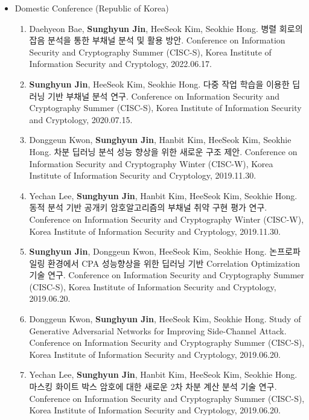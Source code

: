 \documentclass[a4paper,20pt]{article}
\begin{document}
\begin{itemize}
    \item {Domestic Conference (Republic of Korea)}
        \vspace{-6pt}
        \begin{enumerate}
            \item {Daehyeon Bae, \textbf{Sunghyun Jin}, HeeSeok Kim, Seokhie Hong. 병렬 회로의 잡음 분석을 통한 부채널 분석 및 활용 방안. Conference on Information Security and Cryptography Summer (CISC-S), Korea Institute of Information Security and Cryptology, 2022.06.17.}
            \vspace{-2pt}
            \item {\textbf{Sunghyun Jin}, HeeSeok Kim, Seokhie Hong. 다중 작업 학습을 이용한 딥러닝 기반 부채널 분석 연구. Conference on Information Security and Cryptography Summer (CISC-S), Korea Institute of Information Security and Cryptology, 2020.07.15.}
            \vspace{-2pt}
            \item {Donggeun Kwon, \textbf{Sunghyun Jin}, Hanbit Kim, HeeSeok Kim, Seokhie Hong. 차분 딥러닝 분석 성능 향상을 위한 새로운 구조 제안. Conference on Information Security and Cryptography Winter (CISC-W), Korea Institute of Information Security and Cryptology, 2019.11.30.}
            \vspace{-2pt}
            \item {Yechan Lee, \textbf{Sunghyun Jin}, Hanbit Kim, HeeSeok Kim, Seokhie Hong. 동적 분석 기반 공개키 암호알고리즘의 부채널 취약 구현 평가 연구. Conference on Information Security and Cryptography Winter (CISC-W), Korea Institute of Information Security and Cryptology, 2019.11.30.}
            \vspace{-2pt}
            \item {\textbf{Sunghyun Jin}, Donggeun Kwon, HeeSeok Kim, Seokhie Hong. 논프로파일링 환경에서 CPA 성능향상을 위한 딥러닝 기반 Correlation Optimization 기술 연구. Conference on Information Security and Cryptography Summer (CISC-S), Korea Institute of Information Security and Cryptology, 2019.06.20.}
            \vspace{-2pt}
            \item {Donggeun Kwon, \textbf{Sunghyun Jin}, HeeSeok Kim, Seokhie Hong. Study of Generative Adversarial Networks for Improving Side-Channel Attack. Conference on Information Security and Cryptography Summer (CISC-S), Korea Institute of Information Security and Cryptology, 2019.06.20.}
            \vspace{-2pt}
            \item {Yechan Lee, \textbf{Sunghyun Jin}, Hanbit Kim, HeeSeok Kim, Seokhie Hong. 마스킹 화이트 박스 암호에 대한 새로운 2차 차분 계산 분석 기술 연구. Conference on Information Security and Cryptography Summer (CISC-S), Korea Institute of Information Security and Cryptology, 2019.06.20.}

\end{enumerate}
\end{itemize}
\end{document}
